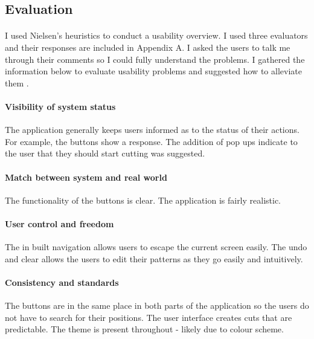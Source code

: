 \documentclass[11pt]{article}
\begin{document}
            \subsection{Evaluation}
            
                \paragraph{}
                I used Nielsen's heuristics to conduct a usability overview. I used three evaluators and their responses are included in Appendix A. I asked the users to talk me through their comments so I could fully understand the problems. I gathered the information below to evaluate usability problems and suggested how to alleviate them \cite{Neil}.

                
                \paragraph{Visibility of system status}
                The application generally keeps users informed as to the status of their actions. For example, the buttons show a response. The addition of pop ups indicate to the user that they should start cutting was suggested. 
                
                \paragraph{Match between system and real world}
                The functionality of the buttons is clear. The application is fairly realistic.
                
                \paragraph{User control and freedom}
                The in built navigation allows users to escape the current screen easily. The undo and clear allows the users to edit their patterns as they go easily and intuitively. 

                \paragraph{Consistency and standards}
                The buttons are in the same place in both parts of the application so the users do not have to search for their positions. The user interface creates cuts that are predictable. The theme is present throughout - likely due to colour scheme.
\end{document}
